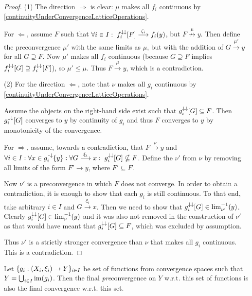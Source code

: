 \begin{proof}
(1) The direction $\Rightarrow$ is clear: $\mu$ makes all $f_i$ continuous by \ref{continuityUnderConvergenceLatticeOperations}.

For $\Leftarrow$, assume $F$ such that $\forall i\in I: \; f_i^{\downarrow\downarrow}[F] \overset{\zeta_i}{\longrightarrow} f_i(y)$, but $F \overset{\mu}{\not\to} y$. Then define the preconvergence $\mu'$ with the same limits as $\mu$, but with the addition of $G\overset{\mu'}{\longrightarrow} y$ for all $G\supseteq F$. Now $\mu'$ makes all $f_i$ continuous (because $G\supseteq F$ implies $f_i^{\downarrow\downarrow}[G] \supseteq f_i^{\downarrow\downarrow}[F]$), so $\mu'\leq \mu$. Thus $F \overset{\mu}{\longrightarrow} y$, which is a contradiction.

(2) For the direction $\Leftarrow$, note that $\nu$ makes all $g_i$ continuous by \ref{continuityUnderConvergenceLatticeOperations}.

Assume the objects on the right-hand side exist such that $g_i^{\downarrow\downarrow}[G] \subseteq F$. Then $g_i^{\downarrow\downarrow}[G]$ converges to $y$ by continuity of $g_i$ and thus $F$ converges to $y$ by monotonicity of the convergence.

For $\Rightarrow$, assume, towards a contradiction, that $F \overset{\nu}{\longrightarrow} y$ and $\forall i\in I: \forall x\in g_i^{{\text{\hspace{0.15em}-}\downarrow}}\{y\}: \forall G\overset{\xi_i}{\longrightarrow} x: \; g_i^{\downarrow\downarrow}[G] \nsubseteq F$. Define the $\nu'$ from $\nu$ by removing all limits of the form $F' \to y$, where $F' \subseteq F$.

Now $\nu'$ is a preconvergence in which $F$ does not converge. In order to obtain a contradiction, it is enough to show that each $g_i$ is still continuous. To that end, take arbitrary $i\in I$ and $G \overset{\xi_i}{\longrightarrow} x$. Then we need to show that $g_i^{\downarrow\downarrow}[G] \in \lim^{-1}_{\nu'}(y)$. Clearly $g_i^{\downarrow\downarrow}[G] \in \lim^{-1}_{\nu}(y)$ and it was also not removed in the construction of $\nu'$ as that would have meant that $g_i^{\downarrow\downarrow}[G] \subseteq F$, which was excluded by assumption.

Thus $\nu'$ is a strictly stronger convergence than $\nu$ that makes all $g_i$ continuous. This is a contradiction.
\end{proof}
\begin{corollary} \label{finalConvergenceConvergence}
Let $\{g_i: \left( X_i, \xi_i \right) \to Y\}_{i\in I}$ be set of functions from convergence spaces such that $Y = \bigcup_{i\in I}\operatorname{im}(g_i)$. Then the final \emph{pre}convergence on $Y$ w.r.t. this set of functions is also the final convergence w.r.t. this set.
\end{corollary}
